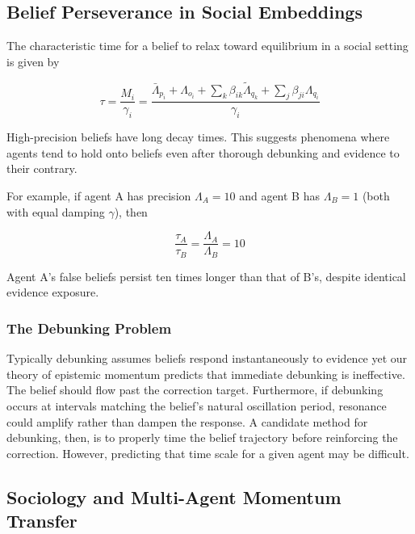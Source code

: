 \documentclass[12pt]{article}
\begin{document}
\subsection{Belief Perseverance in Social Embeddings}

The characteristic time for a belief to relax toward equilibrium in a social setting is given by

\begin{equation}
\boxed{\tau = \frac{M_i}{\gamma_i} = \frac{\bar{\Lambda}_{p_i} + \Lambda_{o_i}+ \sum_k\beta_{ik}\tilde{\Lambda}_{q_k} + \sum_j\beta_{ji}\Lambda_{q_i}}{\gamma_i}}
\end{equation}


High-precision beliefs have long decay times. This suggests phenomena where agents tend to hold onto beliefs even after thorough debunking and evidence to their contrary.

For example, if agent A has precision $\Lambda_A = 10$ and agent B has $\Lambda_B = 1$ (both with equal damping $\gamma$), then

\begin{equation}
\frac{\tau_A}{\tau_B} = \frac{\Lambda_A}{\Lambda_B} = 10
\end{equation}

Agent A's false beliefs persist ten times longer than that of B's, despite identical evidence exposure.

\subsubsection{The Debunking Problem}

Typically debunking assumes beliefs respond instantaneously to evidence yet our theory of epistemic momentum predicts that immediate debunking is ineffective.  The belief should flow past the correction target. Furthermore, if debunking occurs at intervals matching the belief's natural oscillation period, resonance could amplify rather than dampen the response.  A candidate method for debunking, then, is to properly time the belief trajectory before reinforcing the correction.  However, predicting that time scale for a given agent may be difficult.


\subsection{Sociology and Multi-Agent Momentum Transfer}
\end{document}
